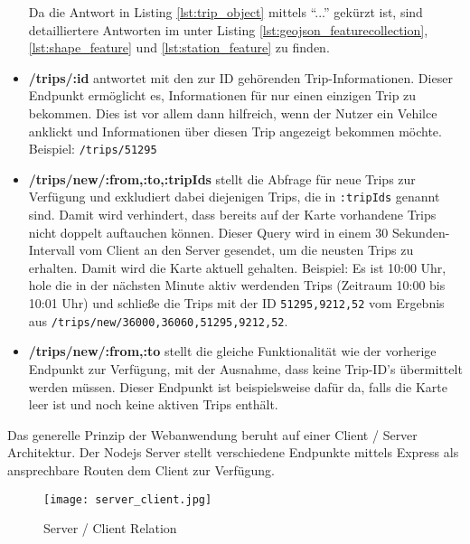 \begin{itemize}
      Da die Antwort in Listing \ref{lst:trip_object} mittels "`..."' gekürzt ist, sind detailliertere Antworten im  unter Listing \ref{lst:geojson_featurecollection}, \ref{lst:shape_feature} und \ref{lst:station_feature} zu finden.

      \item \textbf{/trips/:id} antwortet mit den zur ID gehörenden Trip-Informationen. Dieser Endpunkt ermöglicht es, Informationen für nur einen einzigen Trip zu bekommen. Dies ist vor allem dann hilfreich, wenn der Nutzer ein Vehilce anklickt und Informationen über diesen Trip angezeigt bekommen möchte. Beispiel: \texttt{/trips/51295}

      \item \textbf{/trips/new/:from,:to,:tripIds} stellt die Abfrage für neue Trips zur Verfügung und exkludiert dabei diejenigen Trips, die in \texttt{:tripIds} genannt sind. Damit wird verhindert, dass bereits auf der Karte vorhandene Trips nicht doppelt auftauchen können. Dieser Query wird in einem 30 Sekunden-Intervall vom Client an den Server gesendet, um die neusten Trips zu erhalten. Damit wird die Karte aktuell gehalten. Beispiel: Es ist 10:00 Uhr, hole die in der nächsten Minute aktiv werdenden Trips (Zeitraum 10:00 bis 10:01 Uhr) und schließe die Trips mit der ID \texttt{51295,9212,52} vom Ergebnis aus \texttt{/trips/new/36000,36060,51295,9212,52}.

      \item \textbf{/trips/new/:from,:to} stellt die gleiche Funktionalität wie der vorherige Endpunkt zur Verfügung, mit der Ausnahme, dass keine Trip-ID's übermittelt werden müssen. Dieser Endpunkt ist beispielsweise dafür da, falls die Karte leer ist und noch keine aktiven Trips enthält.

    \end{itemize}


  Das generelle Prinzip der Webanwendung beruht auf einer Client / Server Architektur. Der Nodejs Server stellt verschiedene Endpunkte mittels Express als ansprechbare Routen dem Client zur Verfügung. 

  \begin{figure}[htbp]
    \begin{center}
      \texttt{[image: server\_client.jpg]}
      \caption{Server / Client Relation}
      \label{fig:server_client}
    \end{center}
  \end{figure}


